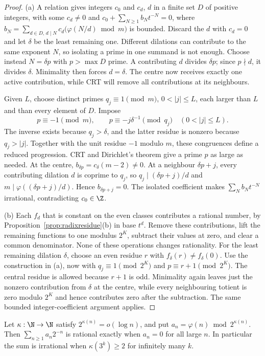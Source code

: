 \begin{proof}
(a) A relation gives integers $c_0$ and $c_d$, $d$ in a finite set $D$ of
positive integers, with some $c_d\ne0$ and
$c_0+\sum_{N\ge1}b_Nt^{-N}=0$, where
$b_N=\sum_{d\in D,\,d\mid N}c_d\bigl(\varphi(N/d)\bmod m\bigr)$ is bounded.
Discard the $d$ with $c_d=0$ and let $\delta$ be the least remaining one.
Different dilations can contribute to the same exponent $N$, so
isolating a prime in one summand is not enough. Choose instead
$N=\delta p$ with $p>\max D$ prime. A contributing $d$ divides
$\delta p$; since $p\nmid d$, it divides $\delta$. Minimality then
forces $d=\delta$. The centre now receives exactly one active
contribution, while CRT will remove all contributions at its neighbours.

Given $L$, choose distinct primes $q_j\equiv1\pmod m$, $0<|j|\le L$,
each larger than $L$ and than every element of $D$. Impose
\[
 p\equiv-1\pmod m,\qquad
 p\equiv-j\delta^{-1}\pmod{q_j}\quad(0<|j|\le L).
\]
The inverse exists because $q_j>\delta$, and the latter residue is
nonzero because $q_j>|j|$. Together with the unit residue $-1$
modulo $m$, these congruences define a reduced progression.
CRT and Dirichlet's theorem give a prime $p$ as large as needed.
At the centre, $b_{\delta p}=c_\delta(m-2)\ne0$.
At a neighbour $\delta p+j$, every contributing dilation $d$ is
coprime to $q_j$, so $q_j\mid(\delta p+j)/d$ and
$m\mid\varphi((\delta p+j)/d)$. Hence $b_{\delta p+j}=0$.
The isolated coefficient makes $\sum_Nb_Nt^{-N}$ irrational,
contradicting $c_0\in\Z$.

(b) Each $f_d$ that is constant on the even classes contributes a rational
number, by Proposition~\ref{prop:radixresidue}(b) in base $t^d$.
Remove these contributions, lift the remaining functions to one
modulus $2^K$, subtract their values at zero, and clear a common
denominator. None of these operations changes rationality.
For the least remaining dilation $\delta$, choose an even residue $r$
with $f_\delta(r)\ne f_\delta(0)$. Use the construction in (a), now
with $q_j\equiv1\pmod{2^K}$ and $p\equiv r+1\pmod{2^K}$.
The central residue is allowed because $r+1$ is odd. Minimality
again leaves just the nonzero contribution from $\delta$ at the
centre, while every neighbouring totient is zero modulo $2^K$
and hence contributes zero after the subtraction. The same bounded
integer-coefficient argument applies.
\end{proof}

\begin{rem}
\label{prop:slowmoduli}
Let $\kappa:\N\to\N$ satisfy $2^{\kappa(n)}=o(\log n)$, and put
$a_n=\varphi(n)\bmod2^{\kappa(n)}$. Then $\sum_{n\ge1}a_n2^{-n}$ is
rational exactly when $a_n=0$ for all large $n$. In particular the sum is
irrational when $\kappa(3^k)\ge2$ for infinitely many $k$.
\end{rem}

